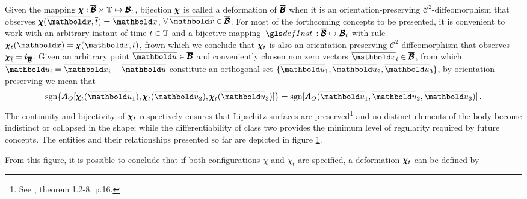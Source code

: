 Given the mapping $\pmb{\chi} : \pmb{\overline{\mathcal{B}}}\times\mathbb{T} \mapsto \pmb{\mathcal{B}}_t$, bijection $\pmb{\chi}$ is called a deformation of $\pmb{\overline{\mathcal{B}}}$ when it is an orientation-preserving $\mathcal{C}^{2}$-diffeomorphism that observes $\fua{\tnr{\chi}}{\overline{\vto{x}},\overline{t}}=\overline{\vto{x}}$, $\forall\,\overline{\vto{x}}\in\tnr{\overline{\mathcal{B}}}$. For most of the forthcoming concepts to be presented, it is convenient to work with an arbitrary instant of time $t\in\mathbb{T}$ and a bijective mapping $\map{\gloref{defInst}}{\tnr{\overline{\mathcal{B}}}}{\tnr{\mathcal{B}}_t}$ with rule $\fua{\tnr{\chi}_t}{\vto{x}}=\fua{\tnr{\chi}}{\vto{x},t}$, frown which we conclude that $\pmb{\chi}_t$ is also an orientation-preserving $\mathcal{C}^{2}$-diffeomorphism that observes $\pmb{\chi}_{\overline{t}}=\pmb{i}_{\pmb{\overline{\mathcal{B}}}}$. Given an arbitrary point $\overline{\vto{u}}\in\tnr{\overline{\mathcal{B}}}$ and conveniently chosen non zero vectors $\overline{\vto{x}}_i\in\tnr{\overline{\mathcal{B}}}$, from which $\overline{\vto{u}}_i=\overline{\vto{x}}_i-\overline{\vto{u}}$ constitute an orthogonal set $\{ \overline{\vto{u}}_1,\overline{\vto{u}}_2,\overline{\vto{u}}_3\}$, by orientation-preserving we mean that   
\begin{equation}\label{eq:orientPreserv}
\mathop{\mathrm{sgn}}\{{\tnr{A}_O}[\fua{\tnr{\chi}_t}{\overline{\vto{u}}_1},\fua{\tnr{\chi}_t}{\overline{\vto{u}}_2},\fua{\tnr{\chi}_t}{\overline{\vto{u}}_3}]\}=\mathop{\mathrm{sgn}}[\fua{\tnr{A}_O}{\overline{\vto{u}}_1,\overline{\vto{u}}_2,\overline{\vto{u}}_3}]\,.
\end{equation}
The continuity and bijectivity of $\pmb{\chi}_t$ respectively ensures that Lipschitz surfaces are preserved\footnote{See \cite{ciarlet_1988_2_2}, theorem 1.2-8, p.16.} and no distinct elements of the body become indistinct or collapsed in the shape; while the differentiability of class two provides the minimum level of regularity required by future concepts. The entities and their relationships presented so far are depicted in figure \ref{fg:deformacao}. 
\begin{figure}[!ht]
\centering
\begin{center}
\scalebox{.72}{}
\end{center}
\label{fg:deformacao}
\end{figure}
From this figure, it is possible to conclude that if both configurations $\overline{\chi}$ and $\chi_t$ are specified, a deformation $\pmb{\chi}_t$ can be defined by 
